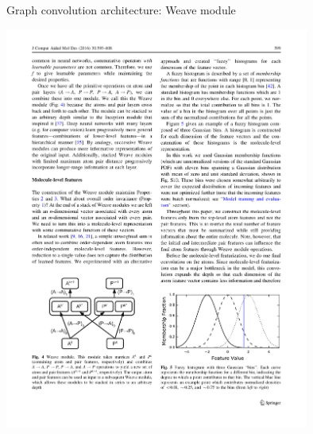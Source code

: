 \documentclass[compress]{beamer}
\begin{document}
\begin{frame}{Graph convolution architecture: Weave module}
  \begin{center}
    \includegraphics[width=0.75\textwidth]{./figures/gc_fig4.pdf}
  \end{center}
\end{frame}
\end{document}
